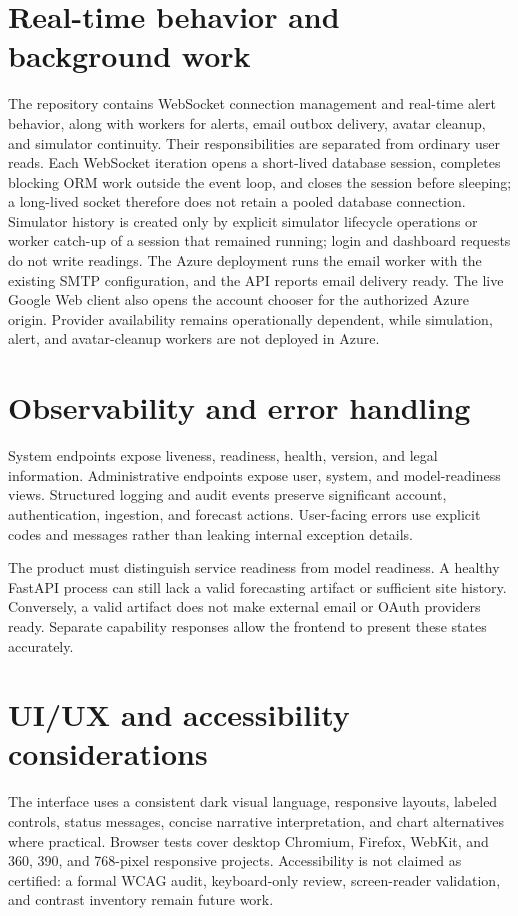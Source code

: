 \section{Real-time behavior and background work}

The repository contains WebSocket connection management and real-time alert behavior, along with workers for alerts, email outbox delivery, avatar cleanup, and simulator continuity. Their responsibilities are separated from ordinary user reads. Each WebSocket iteration opens a short-lived database session, completes blocking ORM work outside the event loop, and closes the session before sleeping; a long-lived socket therefore does not retain a pooled database connection. Simulator history is created only by explicit simulator lifecycle operations or worker catch-up of a session that remained running; login and dashboard requests do not write readings. The Azure deployment runs the email worker with the existing SMTP configuration, and the API reports email delivery ready. The live Google Web client also opens the account chooser for the authorized Azure origin. Provider availability remains operationally dependent, while simulation, alert, and avatar-cleanup workers are not deployed in Azure.

\section{Observability and error handling}

System endpoints expose liveness, readiness, health, version, and legal information. Administrative endpoints expose user, system, and model-readiness views. Structured logging and audit events preserve significant account, authentication, ingestion, and forecast actions. User-facing errors use explicit codes and messages rather than leaking internal exception details.

The product must distinguish service readiness from model readiness. A healthy FastAPI process can still lack a valid forecasting artifact or sufficient site history. Conversely, a valid artifact does not make external email or OAuth providers ready. Separate capability responses allow the frontend to present these states accurately.

\section{UI/UX and accessibility considerations}

The interface uses a consistent dark visual language, responsive layouts, labeled controls, status messages, concise narrative interpretation, and chart alternatives where practical. Browser tests cover desktop Chromium, Firefox, WebKit, and 360, 390, and 768-pixel responsive projects. Accessibility is not claimed as certified: a formal WCAG audit, keyboard-only review, screen-reader validation, and contrast inventory remain future work.


